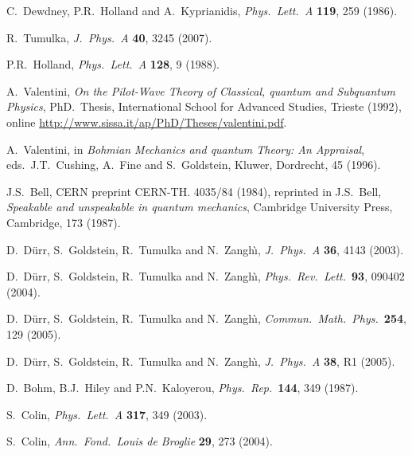\documentclass[12pt]{article}
\begin{document}
\begin{thebibliography}{10}
{C.\ Dewdney, P.R.\ Holland and A.\ Kyprianidis, {\em Phys.\ Lett.\ A} {\bf 119}, 259 (1986).}

{R.\ Tumulka, {\em J.\ Phys.\ A} {\bf 40}, 3245 (2007).}

{P.R.\ Holland, {\em Phys.\ Lett.\ A} {\bf 128}, 9 (1988).}

{A.\ Valentini, {\em On the Pilot-Wave Theory of Classical, quantum and
  Subquantum Physics}, PhD.\ Thesis, International School for Advanced Studies,
  Trieste (1992), online  \url{http://www.sissa.it/ap/PhD/Theses/valentini.pdf}.}

{A.\ Valentini, in {\em Bohmian Mechanics and quantum Theory: An Appraisal},
  eds.\ J.T.\ Cushing, A.\ Fine and S.\ Goldstein, Kluwer, Dordrecht, 45
  (1996).}

{J.S.\ Bell, CERN preprint CERN-TH. 4035/84 (1984), reprinted in J.S.\ Bell, {\em Speakable and unspeakable in
  quantum mechanics}, Cambridge University Press, Cambridge, 173 (1987).}

{D.\ D\"urr, S.\ Goldstein, R.\ Tumulka and N.\ Zangh\`\i, {\em J.\ Phys.\ A}
  {\bf 36}, 4143 (2003).}

{D.\ D\"urr, S.\ Goldstein, R.\ Tumulka and N.\ Zangh\`\i, {\em Phys.\ Rev.\
  Lett.}\ {\bf 93}, 090402 (2004).}

{D.\ D\"urr, S.\ Goldstein, R.\ Tumulka and N.\ Zangh\`\i, {\em Commun.\ Math.\
  Phys.}\ {\bf 254}, 129 (2005).}

{D.\ D\"urr, S.\ Goldstein, R.\ Tumulka and N.\ Zangh\`\i, {\em J.\ Phys.\ A}
  {\bf 38}, R1 (2005).}

{D.\ Bohm, B.J.\ Hiley and P.N.\ Kaloyerou, {\em Phys.\ Rep.}\ {\bf 144}, 349
  (1987).}

{S.\ Colin, {\em Phys.\ Lett.\ A} {\bf 317}, 349 (2003).}

{S.\ Colin, {\em Ann.\ Fond.\ Louis de Broglie} {\bf 29}, 273 (2004).}

\end{thebibliography}
\end{document}
